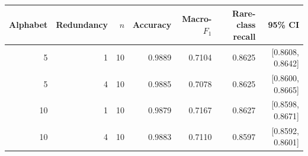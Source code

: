 \begin{tabular}{@{}rrrrrrr@{}}
\toprule
Alphabet & Redundancy & $n$ & Accuracy & Macro-$F_1$ & Rare-class recall & 95\% CI \\
\midrule
5 & 1 & 10 & 0.9889 & 0.7104 & 0.8625 & [0.8608, 0.8642] \\
5 & 4 & 10 & 0.9885 & 0.7078 & 0.8625 & [0.8600, 0.8665] \\
10 & 1 & 10 & 0.9879 & 0.7167 & 0.8627 & [0.8598, 0.8671] \\
10 & 4 & 10 & 0.9883 & 0.7110 & 0.8597 & [0.8592, 0.8601] \\
\bottomrule
\end{tabular}
